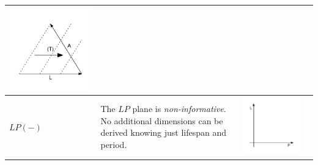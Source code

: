 \documentclass[
  12pt
]{scrartcl}
\begin{document}
\begin{center}
\begin{longtable}{m{}m{}m{}m{}}
  \includegraphics[width = \linewidth]{../fig/ALt_iso.pdf}  \\
  \midrule
  $LP(-)$ &
  The $LP$ plane is \emph{non-informative}. No additional dimensions can be derived knowing just lifespan and period. &
  \includegraphics[width = \linewidth]{../fig/LP.pdf} &

\end{longtable}
\end{center}
\end{document}

